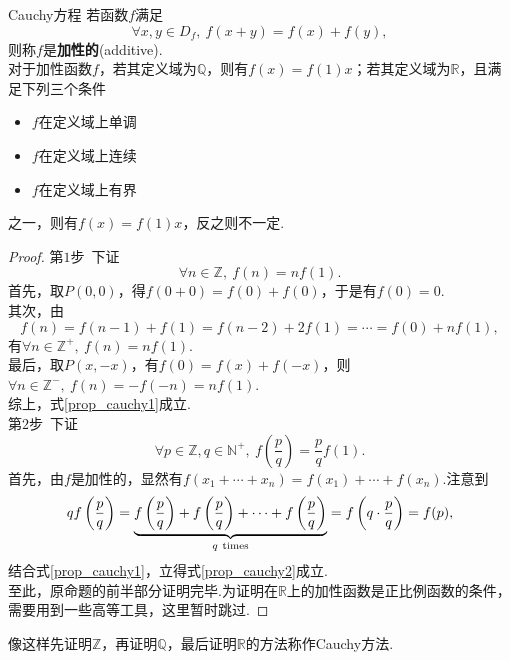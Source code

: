 \documentclass[lang=cn, zihao=5]{elegantbook}
\newcommand{\ssb}[1]{\left( #1 \right)}
\newcommand{\R}{\mathbb{R}}
\begin{document}
\begin{proposition}{Cauchy方程}
	若函数$f$满足$$\forall x,y \in D_f,~f(x+y)=f(x)+f(y),$$
	则称$f$是\textbf{加性的}(additive). \\
	对于加性函数$f$，若其定义域为$\mathbb{Q}$，则有$f(x)=f(1)x$；若其定义域为$\R$，且满足下列三个条件
	\begin{itemize}
		\item $f$在定义域上单调
		\item $f$在定义域上连续
		\item $f$在定义域上有界
	\end{itemize}
	之一，则有$f(x)=f(1)x$，反之则不一定.
\end{proposition}
\begin{proof}
	第$1$步~下证
	\begin{equation}
		\forall n \in \mathbb{Z},~ f(n)=nf(1). \label{prop_cauchy1}
	\end{equation}
	首先，取$P(0,0)$，得$f(0+0)=f(0)+f(0)$，于是有$f(0)=0$. \\
	其次，由$$f(n)=f(n-1)+f(1)=f(n-2)+2f(1)=\cdots =f(0)+nf(1),$$
	有$\forall n \in \mathbb{Z}^+,~ f(n)=nf(1)$. \\
	最后，取$P(x,-x)$，有$f(0)=f(x)+f(-x)$，则$\forall n \in \mathbb{Z}^-,~f(n)=-f(-n)=nf(1)$. \\
	综上，式\ref{prop_cauchy1}成立. \\
	第$2$步~下证
	\begin{equation}
		\forall p \in \mathbb{Z},q \in \mathbb{N}^+,~ f\ssb{\frac{p}{q}}=\frac{p}{q} f(1). \label{prop_cauchy2}
	\end{equation}
	首先，由$f$是加性的，显然有$f(x_1+ \cdots +x_n)=f(x_1) + \cdots + f(x_n)$.注意到$$qf\ssb{\frac{p}{q}} = \underbrace{f\ssb{\frac{p}{q}} + f\ssb{\frac{p}{q}} + \cdots + f\ssb{\frac{p}{q}}}_{q~ \rm times} = f\ssb{q \cdot \frac{p}{q}} = f(p),$$
	结合式\ref{prop_cauchy1}，立得式\ref{prop_cauchy2}成立. \\
	至此，原命题的前半部分证明完毕.为证明在$\R$上的加性函数是正比例函数的条件，需要用到一些高等工具，这里暂时跳过.
\end{proof}
\begin{remark}
	像这样先证明$\mathbb{Z}$，再证明$\mathbb{Q}$，最后证明$\R$的方法称作Cauchy方法.
\end{remark}
\end{document}
